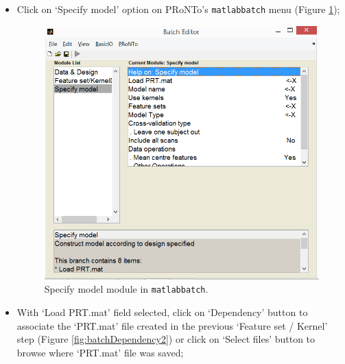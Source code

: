 \begin{itemize}

\item Click on `Specify model' option on PRoNTo's {\tt matlabbatch} menu (Figure \ref{fig:batchSpecifyModel});
	
	\begin{figure}[h!]
	\centering
		\includegraphics[scale=0.6]{images/Tutorial/classification/batchSpecifyModel.png}
	\caption{Specify model module in {\tt matlabbatch}.}
	\label{fig:batchSpecifyModel}
\end{figure}
	
	\item With `Load PRT.mat' field selected, click on `Dependency' button to associate the `PRT.mat' file created in the previous `Feature set / Kernel' step (Figure \ref{fig:batchDependency2}) or click on `Select files' button to browse where `PRT.mat' file was saved;
	

\end{itemize}
